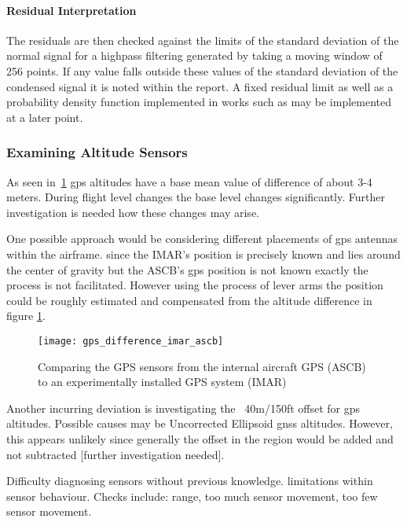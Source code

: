 \paragraph{Residual Interpretation}


The residuals are then checked against the limits of the standard deviation of the normal signal for a highpass filtering generated by taking a moving window of 256 points. If any value falls outside these values of the standard deviation of the condensed signal it is noted within the report. A fixed residual limit as well as a probability density function implemented in works such as \cite{svard_data-driven_2014} may be implemented at a later point.

\subsubsection{Examining Altitude Sensors}

As seen in~\ref{fig:gps_diff} gps altitudes have a base mean value of difference of about 3-4 meters. During flight level changes the base level changes significantly. Further investigation is needed how these changes may arise.

One possible approach would be considering different placements of gps antennas within the airframe. since the IMAR's position is precisely known and lies around the center of gravity but the ASCB's gps position is not known exactly the process is not facilitated. However using the process of lever arms the position could be roughly estimated and compensated from the altitude difference in figure \ref{fig:gps_diff}.

\begin{figure}[h]
    \centering
    \texttt{[image: gps\_difference\_imar\_ascb]}
    \caption{Comparing the GPS sensors from the internal aircraft GPS (ASCB) to an experimentally installed GPS system (IMAR)}
    \label{fig:gps_diff}
\end{figure}

Another incurring deviation is investigating the ~40m/150ft offset for gps altitudes. Possible causes may be Uncorrected Ellipsoid gnss altitudes. However, this appears unlikely since generally the offset in the region would be added and not subtracted [further investigation needed].


Difficulty diagnosing sensors without previous knowledge. limitations within sensor behaviour. Checks include: range, too much sensor movement, too few sensor movement.

